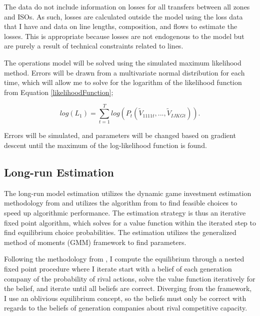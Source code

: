 \documentclass[12pt]{article}
\begin{document}
The data do not include information on losses for all transfers between all zones and ISOs. As such, losses are calculated outside the model using the loss data that I have and data on line lengths, composition, and flows to estimate the losses. This is appropriate because losses are not endogenous to the model but are purely a result of technical constraints related to lines.

The operations model will be solved using the simulated maximum likelihood method. Errors will be drawn from a multivariate normal distribution for each time, which will allow me to solve for the logarithm of the likelihood function from Equation \ref{likelihoodFunction};

\begin{equation}
log(L_1)= \sum_{t=1}^T log(P_t(\tilde{V}_{1111t},...,\tilde{V}_{IJKGt})).
\end{equation}

Errors will be simulated, and parameters will be changed based on gradient descent until the maximum of the log-likelihood function is found.

\subsection{Long-run Estimation}

The long-run model estimation utilizes the dynamic game investment estimation methodology from \cite{pakes1998empirical} and utilizes the algorithm from \cite{gowrisankaran2024computable} to find feasible choices to speed up algorithmic performance. The estimation strategy is thus an iterative fixed point algorithm, which solves for a value function within the iterated step to find equilibrium choice probabilities. The estimation utilizes the generalized method of moments (GMM) framework to find parameters. 

Following the methodology from \cite{gowrisankaran2024computable}, I compute the equilibrium through a nested fixed point procedure where I iterate start with a belief of each generation company of the probability of rival actions, solve the value function iteratively for the belief, and iterate until all beliefs are correct. Diverging from the framework, I use an oblivious equilibrium concept, so the beliefs must only be correct with regards to the beliefs of generation companies about rival competitive capacity.
\end{document}
